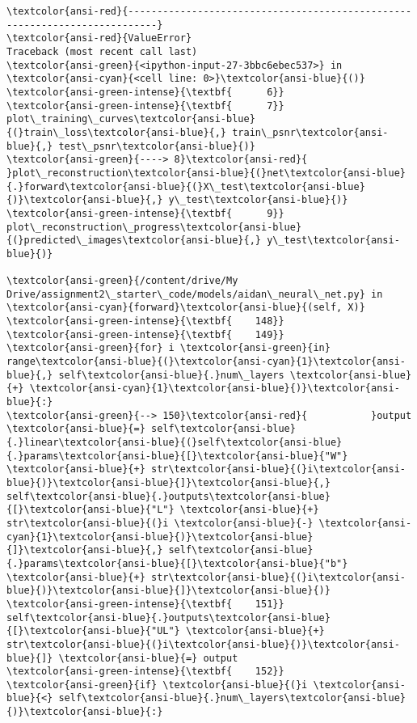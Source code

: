 \documentclass[11pt]{article}
\begin{document}
    \begin{Verbatim}[commandchars=\\\{\}, frame=single, framerule=2mm, rulecolor=\color{outerrorbackground}]
\textcolor{ansi-red}{---------------------------------------------------------------------------}
\textcolor{ansi-red}{ValueError}                                Traceback (most recent call last)
\textcolor{ansi-green}{<ipython-input-27-3bbc6ebec537>} in \textcolor{ansi-cyan}{<cell line: 0>}\textcolor{ansi-blue}{()}
\textcolor{ansi-green-intense}{\textbf{      6}} 
\textcolor{ansi-green-intense}{\textbf{      7}} plot\_training\_curves\textcolor{ansi-blue}{(}train\_loss\textcolor{ansi-blue}{,} train\_psnr\textcolor{ansi-blue}{,} test\_psnr\textcolor{ansi-blue}{)}
\textcolor{ansi-green}{----> 8}\textcolor{ansi-red}{ }plot\_reconstruction\textcolor{ansi-blue}{(}net\textcolor{ansi-blue}{.}forward\textcolor{ansi-blue}{(}X\_test\textcolor{ansi-blue}{)}\textcolor{ansi-blue}{,} y\_test\textcolor{ansi-blue}{)}
\textcolor{ansi-green-intense}{\textbf{      9}} plot\_reconstruction\_progress\textcolor{ansi-blue}{(}predicted\_images\textcolor{ansi-blue}{,} y\_test\textcolor{ansi-blue}{)}

\textcolor{ansi-green}{/content/drive/My Drive/assignment2\_starter\_code/models/aidan\_neural\_net.py} in \textcolor{ansi-cyan}{forward}\textcolor{ansi-blue}{(self, X)}
\textcolor{ansi-green-intense}{\textbf{    148}} 
\textcolor{ansi-green-intense}{\textbf{    149}}         \textcolor{ansi-green}{for} i \textcolor{ansi-green}{in} range\textcolor{ansi-blue}{(}\textcolor{ansi-cyan}{1}\textcolor{ansi-blue}{,} self\textcolor{ansi-blue}{.}num\_layers \textcolor{ansi-blue}{+} \textcolor{ansi-cyan}{1}\textcolor{ansi-blue}{)}\textcolor{ansi-blue}{:}
\textcolor{ansi-green}{--> 150}\textcolor{ansi-red}{           }output \textcolor{ansi-blue}{=} self\textcolor{ansi-blue}{.}linear\textcolor{ansi-blue}{(}self\textcolor{ansi-blue}{.}params\textcolor{ansi-blue}{[}\textcolor{ansi-blue}{"W"} \textcolor{ansi-blue}{+} str\textcolor{ansi-blue}{(}i\textcolor{ansi-blue}{)}\textcolor{ansi-blue}{]}\textcolor{ansi-blue}{,} self\textcolor{ansi-blue}{.}outputs\textcolor{ansi-blue}{[}\textcolor{ansi-blue}{"L"} \textcolor{ansi-blue}{+} str\textcolor{ansi-blue}{(}i \textcolor{ansi-blue}{-} \textcolor{ansi-cyan}{1}\textcolor{ansi-blue}{)}\textcolor{ansi-blue}{]}\textcolor{ansi-blue}{,} self\textcolor{ansi-blue}{.}params\textcolor{ansi-blue}{[}\textcolor{ansi-blue}{"b"} \textcolor{ansi-blue}{+} str\textcolor{ansi-blue}{(}i\textcolor{ansi-blue}{)}\textcolor{ansi-blue}{]}\textcolor{ansi-blue}{)}
\textcolor{ansi-green-intense}{\textbf{    151}}           self\textcolor{ansi-blue}{.}outputs\textcolor{ansi-blue}{[}\textcolor{ansi-blue}{"UL"} \textcolor{ansi-blue}{+} str\textcolor{ansi-blue}{(}i\textcolor{ansi-blue}{)}\textcolor{ansi-blue}{]} \textcolor{ansi-blue}{=} output
\textcolor{ansi-green-intense}{\textbf{    152}}           \textcolor{ansi-green}{if} \textcolor{ansi-blue}{(}i \textcolor{ansi-blue}{<} self\textcolor{ansi-blue}{.}num\_layers\textcolor{ansi-blue}{)}\textcolor{ansi-blue}{:}


\end{Verbatim}
\end{document}
